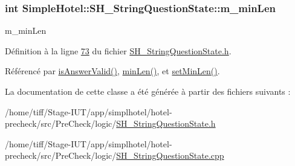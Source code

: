 \hypertarget{classSimpleHotel_1_1SH__StringQuestionState_a69ae39a696138f6078705509b0dbfa88}{
\subsubsection[{m\-\_\-min\-Len}]{\setlength{\rightskip}{0pt plus 5cm}int Simple\-Hotel\-::\-S\-H\-\_\-\-String\-Question\-State\-::m\-\_\-min\-Len\hspace{0.3cm}{\ttfamily [private]}}}\label{classSimpleHotel_1_1SH__StringQuestionState_a69ae39a696138f6078705509b0dbfa88}


m\-\_\-min\-Len 



Définition à la ligne \hyperlink{SH__StringQuestionState_8h_source_l00073}{73} du fichier \hyperlink{SH__StringQuestionState_8h_source}{S\-H\-\_\-\-String\-Question\-State.\-h}.



Référencé par \hyperlink{classSimpleHotel_1_1SH__StringQuestionState_a64428aab057a96918f2f97815c7c2717}{is\-Answer\-Valid()}, \hyperlink{classSimpleHotel_1_1SH__StringQuestionState_abe581cfd2fc9591effad3f07b33544a1}{min\-Len()}, et \hyperlink{classSimpleHotel_1_1SH__StringQuestionState_a391cd56671790f9553cd99aa5bef5f50}{set\-Min\-Len()}.



La documentation de cette classe a été générée à partir des fichiers suivants \-:\begin{DoxyCompactItemize}
\item 
/home/tiff/\-Stage-\/\-I\-U\-T/app/simplhotel/hotel-\/precheck/src/\-Pre\-Check/logic/\hyperlink{SH__StringQuestionState_8h}{S\-H\-\_\-\-String\-Question\-State.\-h}\item 
/home/tiff/\-Stage-\/\-I\-U\-T/app/simplhotel/hotel-\/precheck/src/\-Pre\-Check/logic/\hyperlink{SH__StringQuestionState_8cpp}{S\-H\-\_\-\-String\-Question\-State.\-cpp}\end{DoxyCompactItemize}

